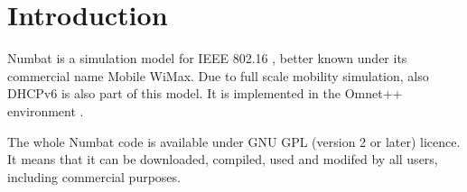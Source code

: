 \section{Introduction}

Numbat is a simulation model for IEEE 802.16 \cite{802.16e}, better
known under its commercial name Mobile WiMax. Due to full scale
mobility simulation, also DHCPv6 is also part of this model. It is
implemented in the Omnet++ environment \cite{omnet}. 

The whole Numbat code is available under GNU GPL (version 2 or later)
licence. It means that it can be downloaded, compiled, used and
modifed by all users, including commercial purposes. 
